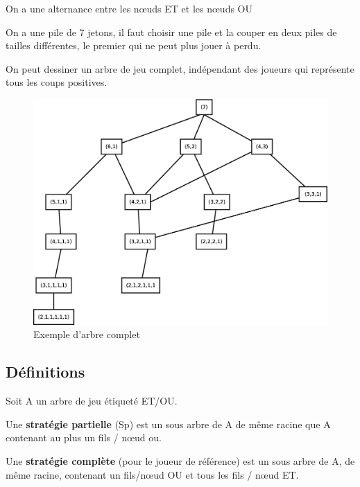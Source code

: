\documentclass[12pt,a4paper,openany]{book}
\begin{document}
	\begin{remarque}
		On a une alternance entre les nœuds ET et les nœuds OU

	\end{remarque}

	\begin{exemple}
		 On a une pile de 7 jetons, il faut choisir une pile
		 et la couper en deux piles de tailles différentes, le
		 premier qui ne peut plus jouer à perdu.

		 On peut dessiner un arbre de jeu complet,
		 indépendant des joueurs qui représente tous les coups
		 positives.

		 \begin{figure}[H]
			 \centering
			 \includegraphics[width=15cm]{Diagramme7.eps}
			 \caption{Exemple d'arbre complet}
		 \end{figure}
	\end{exemple}
	\subsection{Définitions}
		Soit A un arbre de jeu étiqueté ET/OU.

	\begin{definition}
		Une \textbf{stratégie partielle} (Sp) est un sous arbre de A de même
		racine que A contenant au plus un fils / nœud ou.
	\end{definition}

	\begin{definition}
		Une \textbf{stratégie complète} (pour le joueur de
		référence) est 
		un sous arbre de A, de même racine, contenant un
		fils/nœud OU et tous les fils / nœud ET.
	\end{definition}
\end{document}

